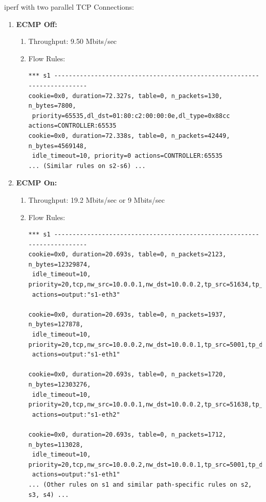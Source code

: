 \documentclass[12pt]{article}
\begin{document}
\noindent iperf with two parallel TCP Connections:
\begin{enumerate}
    \item \textbf{ECMP Off:}
    \begin{enumerate}
        \item Throughput: 9.50 Mbits/sec
        \item Flow Rules:
        \begin{verbatim}
*** s1 ------------------------------------------------------------------------
cookie=0x0, duration=72.327s, table=0, n_packets=130, n_bytes=7800, 
 priority=65535,dl_dst=01:80:c2:00:00:0e,dl_type=0x88cc actions=CONTROLLER:65535
cookie=0x0, duration=72.338s, table=0, n_packets=42449, n_bytes=4569148, 
 idle_timeout=10, priority=0 actions=CONTROLLER:65535
... (Similar rules on s2-s6) ...
        \end{verbatim}
    \end{enumerate}
    \item \textbf{ECMP On:}
    \begin{enumerate}
        \item Throughput: 19.2 Mbits/sec or 9 Mbits/sec
        \item Flow Rules:
        \begin{verbatim}
*** s1 ------------------------------------------------------------------------
cookie=0x0, duration=20.693s, table=0, n_packets=2123, n_bytes=12329874, 
 idle_timeout=10, priority=20,tcp,nw_src=10.0.0.1,nw_dst=10.0.0.2,tp_src=51634,tp_dst=5001 
 actions=output:"s1-eth3"

cookie=0x0, duration=20.693s, table=0, n_packets=1937, n_bytes=127878, 
 idle_timeout=10, priority=20,tcp,nw_src=10.0.0.2,nw_dst=10.0.0.1,tp_src=5001,tp_dst=51634 
 actions=output:"s1-eth1"

cookie=0x0, duration=20.693s, table=0, n_packets=1720, n_bytes=12303276, 
 idle_timeout=10, priority=20,tcp,nw_src=10.0.0.1,nw_dst=10.0.0.2,tp_src=51638,tp_dst=5001 
 actions=output:"s1-eth2"

cookie=0x0, duration=20.693s, table=0, n_packets=1712, n_bytes=113028, 
 idle_timeout=10, priority=20,tcp,nw_src=10.0.0.2,nw_dst=10.0.0.1,tp_src=5001,tp_dst=51638 
 actions=output:"s1-eth1"
... (Other rules on s1 and similar path-specific rules on s2, s3, s4) ...
        \end{verbatim}
    \end{enumerate}
\end{enumerate}
\end{document}

